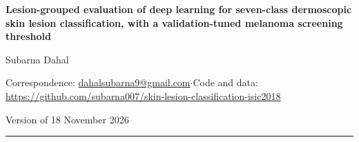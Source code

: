 \documentclass[11pt,a4paper]{article}
\begin{document}
\begin{center}
{\LARGE\bfseries Lesion-grouped evaluation of deep learning for seven-class dermoscopic skin lesion classification, with a validation-tuned melanoma screening threshold\par}
\vspace{1.0em}
{\large Subarna Dahal\par}
\vspace{0.3em}
{\small Correspondence: \href{mailto:dahalsubarna9@gmail.com}{dahalsubarna9@gmail.com}\quad$\cdot$\quad Code and data: \url{https://github.com/subarna007/skin-lesion-classification-isic2018}\par}
\vspace{0.3em}
{\small Version of 18 November 2026\par}
\end{center}
\vspace{0.4em}

\noindent\rule{\textwidth}{0.4pt}
\end{document}
